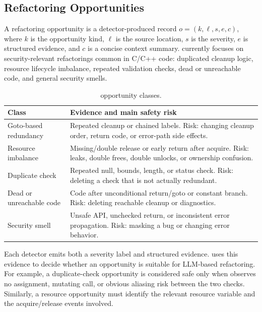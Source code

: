 \subsection{Refactoring Opportunities}
\label{sec:prelim-opportunities}

A refactoring opportunity is a detector-produced record
$o=(k,\ell,s,e,c)$, where $k$ is the opportunity kind, $\ell$ is the source
location, $s$ is the severity, $e$ is structured evidence, and $c$ is a concise
context summary. \SysName{} currently focuses on security-relevant refactorings common
in C/C++ code: duplicated cleanup logic, resource lifecycle imbalance, repeated
validation checks, dead or unreachable code, and general security smells.

\begin{table}[t]
  \centering
  \caption{\SysName{} opportunity classes.}
  \label{tab:opportunity-classes}
  \footnotesize
  \begin{tabularx}{\columnwidth}{@{}>{\raggedright\arraybackslash}p{}>{\raggedright\arraybackslash}X@{}}
    \toprule
    \textbf{Class} & \textbf{Evidence and main safety risk} \\
    \midrule
    Goto-based redundancy &
    Repeated cleanup or chained labels. Risk: changing cleanup order, return code, or error-path side effects. \\
    Resource imbalance &
    Missing/double release or early return after acquire. Risk: leaks, double frees, double unlocks, or ownership confusion. \\
    Duplicate check &
    Repeated null, bounds, length, or status check. Risk: deleting a check that is not actually redundant. \\
    Dead or unreachable code &
    Code after unconditional return/goto or constant branch. Risk: deleting reachable cleanup or diagnostics. \\
    Security smell &
    Unsafe API, unchecked return, or inconsistent error propagation. Risk: masking a bug or changing error behavior. \\
    \bottomrule
  \end{tabularx}
\end{table}

Each detector emits both a severity label and structured evidence. \SysName{} uses
this evidence to decide whether an opportunity is suitable for LLM-based
refactoring. For example, a duplicate-check opportunity is considered safe only
when \SysName{} observes no assignment, mutating call, or obvious aliasing risk between
the two checks. Similarly, a resource opportunity must identify the relevant
resource variable and the acquire/release events involved.

